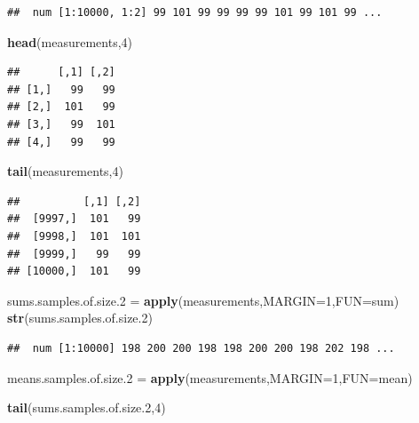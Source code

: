 \documentclass[]{book}
\newenvironment{Shaded}{\begin{snugshade}}{\end{snugshade}}
\newcommand{\DataTypeTok}[1]{\textcolor[rgb]{0.13,0.29,0.53}{#1}}
\newcommand{\DecValTok}[1]{\textcolor[rgb]{0.00,0.00,0.81}{#1}}
\newcommand{\FloatTok}[1]{\textcolor[rgb]{0.00,0.00,0.81}{#1}}
\newcommand{\KeywordTok}[1]{\textcolor[rgb]{0.13,0.29,0.53}{\textbf{#1}}}
\newcommand{\NormalTok}[1]{#1}
\newcommand{\StringTok}[1]{\textcolor[rgb]{0.31,0.60,0.02}{#1}}
\begin{document}
\begin{verbatim}
##  num [1:10000, 1:2] 99 101 99 99 99 99 101 99 101 99 ...
\end{verbatim}

\begin{Shaded}
\begin{Highlighting}[]
\KeywordTok{head}\NormalTok{(measurements,}\DecValTok{4}\NormalTok{)}
\end{Highlighting}
\end{Shaded}

\begin{verbatim}
##      [,1] [,2]
## [1,]   99   99
## [2,]  101   99
## [3,]   99  101
## [4,]   99   99
\end{verbatim}

\begin{Shaded}
\begin{Highlighting}[]
\KeywordTok{tail}\NormalTok{(measurements,}\DecValTok{4}\NormalTok{)}
\end{Highlighting}
\end{Shaded}

\begin{verbatim}
##          [,1] [,2]
##  [9997,]  101   99
##  [9998,]  101  101
##  [9999,]   99   99
## [10000,]  101   99
\end{verbatim}

\begin{Shaded}
\begin{Highlighting}[]
\NormalTok{sums.samples.of.size}\FloatTok{.2}\NormalTok{ =}\StringTok{ }\KeywordTok{apply}\NormalTok{(measurements,}\DataTypeTok{MARGIN=}\DecValTok{1}\NormalTok{,}\DataTypeTok{FUN=}\NormalTok{sum)}
\KeywordTok{str}\NormalTok{(sums.samples.of.size}\FloatTok{.2}\NormalTok{)}
\end{Highlighting}
\end{Shaded}

\begin{verbatim}
##  num [1:10000] 198 200 200 198 198 200 200 198 202 198 ...
\end{verbatim}

\begin{Shaded}
\begin{Highlighting}[]
\NormalTok{means.samples.of.size}\FloatTok{.2}\NormalTok{ =}\StringTok{ }\KeywordTok{apply}\NormalTok{(measurements,}\DataTypeTok{MARGIN=}\DecValTok{1}\NormalTok{,}\DataTypeTok{FUN=}\NormalTok{mean)}

\KeywordTok{tail}\NormalTok{(sums.samples.of.size}\FloatTok{.2}\NormalTok{,}\DecValTok{4}\NormalTok{)}
\end{Highlighting}
\end{Shaded}
\end{document}
